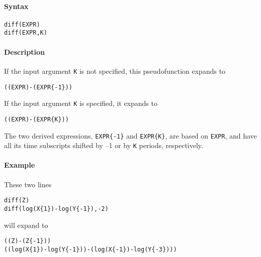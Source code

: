 


	\paragraph{Syntax}\label{syntax}

\begin{verbatim}
diff(EXPR)
diff(EXPR,K)
\end{verbatim}

\paragraph{Description}\label{description}

If the input argument \texttt{K} is not specified, this pseudofunction
expands to

\begin{verbatim}
((EXPR)-(EXPR{-1}))
\end{verbatim}

If the input argument \texttt{K} is specified, it expands to

\begin{verbatim}
((EXPR)-(EXPR{K}))
\end{verbatim}

The two derived expressions, \texttt{EXPR\{-1\}} and \texttt{EXPR\{K\}},
are based on \texttt{EXPR}, and have all its time subscripts shifted by
--1 or by \texttt{K} periods, respectively.

\paragraph{Example}\label{example}

These two lines

\begin{verbatim}
diff(Z)
diff(log(X{1})-log(Y{-1}),-2)
\end{verbatim}

will expand to

\begin{verbatim}
((Z)-(Z{-1}))
((log(X{1})-log(Y{-1}))-(log(X{-1})-log(Y{-3})))
\end{verbatim}


